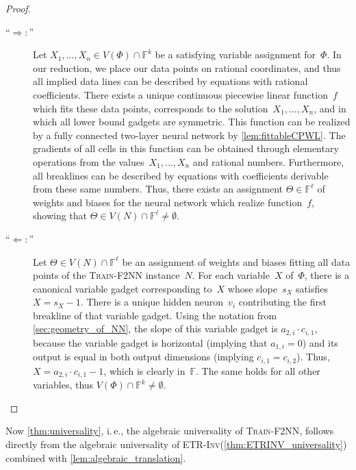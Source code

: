 \documentclass[11pt]{article}
\numberwithin{equation}{section}
\theoremstyle{definition}
\theoremstyle{plain}
\newcommand{\ie}{i.\,e.}
\newcommand{\F}{\ensuremath{\mathbb{F}}\xspace}
\newcommand{\problemname}[1]{\textnormal{\textsc{#1}}\xspace}
\newcommand{\trainNN}{\problemname{Train-F2NN}}
\newcommand{\ETRINV}{\problemname{ETR-Inv}}
\newcommand{\fullyconnected}{fully connected\xspace}
\newcommand{\twolayer}{two-layer\xspace}
\newcommand{\CPWL}{continuous piecewise linear\xspace}
\theoremstyle{plain}
\begin{document}
\begin{proof}
    \begin{description}
        \item[\enquote{$\Longrightarrow:$}]
        Let $X_1, \ldots, X_n \in V(\Phi) \cap \F^k$ be a satisfying variable assignment for~$\Phi$.
        In our reduction, we place our data points on rational coordinates, and thus all implied data lines can be described by equations with rational coefficients.
        There exists a unique \CPWL function~$f$ which fits these data points, corresponds to the solution~$X_1, \ldots, X_n$, and in which all lower bound gadgets are symmetric.
        This function can be realized by a \fullyconnected \twolayer neural network by \cref{lem:fittableCPWL}.
        The gradients of all cells in this function can be obtained through elementary operations from the values~$X_1, \ldots, X_n$ and rational numbers.
        Furthermore, all breaklines can be described by equations with coefficients derivable from these same numbers.
        Thus, there %
exists an assignment $\Theta \in \F^\ell$ of weights and biases %
for the neural network which realize function~$f$, showing that $\Theta \in V(N) \cap \F^\ell \neq \emptyset$.
        
        \item[\enquote{$\Longleftarrow:$}]
         Let $\Theta \in V(N) \cap \F^\ell$ be %
an assignment %
of weights and biases fitting all data points of the \trainNN instance~$N$.
        For each variable~$X$ of~$\Phi$, there is a canonical variable gadget corresponding to~$X$ whose slope~$s_X$ satisfies~$X = s_X - 1$.
        There is a unique hidden neuron~$v_i$ contributing the first breakline of that variable gadget.
        Using the notation from \cref{sec:geometry_of_NN}, the slope of this variable gadget is $a_{2,i} \cdot c_{i,1}$, because the variable gadget is horizontal (implying that $a_{1,i} = 0$) and its output is equal in both output dimensions (implying $c_{i,1} = c_{i,2}$).
        Thus, $X = a_{2,i} \cdot c_{i,1} - 1$, which is clearly in~$\F$.
        The same holds for all other variables, thus $V(\Phi) \cap \F^k \neq \emptyset$.
        \qedhere
    \end{description}
\end{proof}

Now \cref{thm:universality}, \ie,  the algebraic universality of \trainNN, follows directly from the algebraic universality of \ETRINV (\cref{thm:ETRINV_universality}) combined with \cref{lem:algebraic_translation}.
\end{document}

